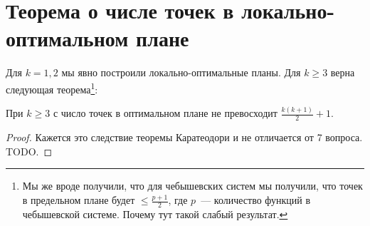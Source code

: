 \section{Теорема о числе точек в локально-оптимальном плане}

Для $k=1,2$ мы явно построили локально-оптимальные планы. Для $k\geq 3$ верна следующая теорема\footnote{Мы же вроде получили, что для чебышевских систем мы получили, что точек в предельном плане будет $\leq \frac{p+1}{2}$, где $p$ — количество функций в чебышевской системе. Почему тут такой слабый результат.}:

\begin{thm}
При $k \geq 3$ с число точек в оптимальном плане не превосходит $\frac{k(k+1)}{2}+1$.
\end{thm}
 
 \begin{proof}
     Кажется это следствие теоремы Каратеодори и не отличается от 7 вопроса.{\color{blue} TODO}. 
 \end{proof}
